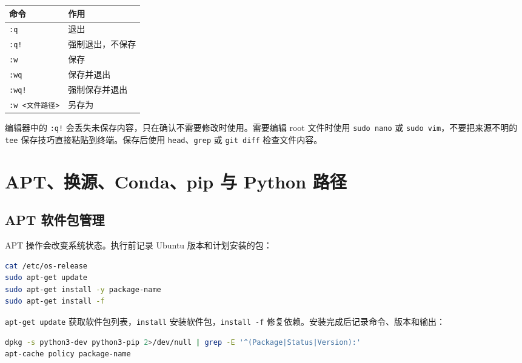 \begin{longtable}[]{@{}ll@{}}
\toprule\noalign{}
命令 & 作用 \\
\midrule\noalign{}
\endhead
\bottomrule\noalign{}
\endlastfoot
\passthrough{\lstinline!:q!} & 退出 \\
\passthrough{\lstinline":q!"} & 强制退出，不保存 \\
\passthrough{\lstinline!:w!} & 保存 \\
\passthrough{\lstinline!:wq!} & 保存并退出 \\
\passthrough{\lstinline":wq!"} & 强制保存并退出 \\
\passthrough{\lstinline!:w <文件路径>!} & 另存为 \\
\end{longtable}

编辑器中的 \passthrough{\lstinline":q!"}
会丢失未保存内容，只在确认不需要修改时使用。需要编辑 root 文件时使用
\passthrough{\lstinline!sudo nano!} 或
\passthrough{\lstinline!sudo vim!}，不要把来源不明的
\passthrough{\lstinline!tee!} 保存技巧直接粘贴到终端。保存后使用
\passthrough{\lstinline!head!}、\passthrough{\lstinline!grep!} 或
\passthrough{\lstinline!git diff!} 检查文件内容。

\section{APT、换源、Conda、pip 与 Python
路径}\label{aptux6362ux6e90condapip-ux4e0e-python-ux8defux5f84}

\subsection{APT 软件包管理}\label{apt-ux8f6fux4ef6ux5305ux7ba1ux7406}

APT 操作会改变系统状态。执行前记录 Ubuntu 版本和计划安装的包：

\begin{lstlisting}[language=bash]
cat /etc/os-release
sudo apt-get update
sudo apt-get install -y package-name
sudo apt-get install -f
\end{lstlisting}

\passthrough{\lstinline!apt-get update!}
获取软件包列表，\passthrough{\lstinline!install!}
安装软件包，\passthrough{\lstinline!install -f!}
修复依赖。安装完成后记录命令、版本和输出：

\begin{lstlisting}[language=bash]
dpkg -s python3-dev python3-pip 2>/dev/null | grep -E '^(Package|Status|Version):'
apt-cache policy package-name
\end{lstlisting}

